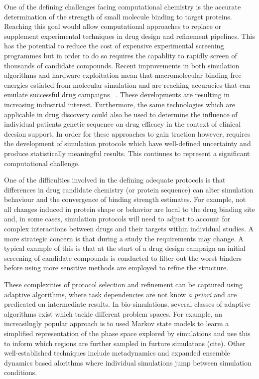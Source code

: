 One of the defining challenges facing computational chemistry is the accurate 
determination of the strength of small molecule binding to target proteins.
Reaching this goal would allow computational approaches to replace or supplement
experimental techniques in drug design and refinement pipelines.
This has the potential to reduce the cost of expensive experimental screening 
programmes but in order to do so requires the capablity to rapidly screen of 
thousands of candidate compounds. 
Recent improvements in both simulation algorithms and hardware exploitation 
mean that macromolecular binding free energies estiated from molecular simulation 
and are reaching accuracies that can emulate successful drug campaigns 
~\cite{DeVivo2016}.
These developments are resulting in increasing industrial interest.
Furthermore, the same technologies which are applicable in drug discovery 
could also be used to determine the influence of individual patients genetic 
sequence on drug efficacy in the context of clinical decsion support.
In order for these approaches to gain traction however, requires the development 
of simulation protocols which have well-defined uncertainty and 
produce statistically meaningful results.
This continues to represent a significant computational challenge. 

One of the difficulties involved in the defining adequate protocols is that 
differences in drug candidate chemistry (or protein sequence) can alter 
simulation behaviour and the convergence of binding strength estimates.
For example, not all changes induced in protein shape or behavior are local 
to the drug binding site and, in some cases, simulation protocols will need to 
adjust to account for complex interactions between drugs and their targets within 
individual studies.
A more strategic concern is that during a study the requirements may change. 
A typical example of this is that at the start of a drug design campaign
an initial screening of candidate compounds is conducted to filter out the worst 
binders before using more sensitive methods are employed to refine the structure.

These complexities of protocol selection and refinement can be captured using 
adaptive algorithms, where task  dependencies are not know 
\textit{a priori} and are predicated on intermediate results. 
In bio-simulations, several classes of adaptive algorithms exist which tackle 
different problem spaces. 
For example, an increasilngly popular approach is to used Markov state models to 
learm a simplified representation of the phase space explored by simulations and
use this to inform which regions are further sampled in furture simulatons (cite). 
Other well-established techniques include metadynamics and expanded ensemble dynamics 
based alorithms where individual simulations jump between simulation conditions. 

